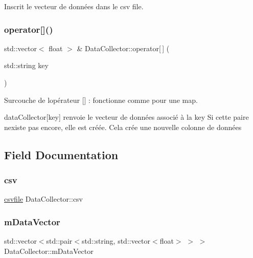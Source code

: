 Inscrit le vecteur de données dans le csv file. 

\mbox{\label{classDataCollector_aa7cc44e889e13c2b03d0128917c57454}} 
\subsubsection{\texorpdfstring{operator[]()}{operator[]()}}
{\footnotesize\ttfamily std\+::vector$<$ float $>$ \& Data\+Collector\+::operator\mbox{[}$\,$\mbox{]} (\begin{DoxyParamCaption}\item[{std\+::string}]{key }\end{DoxyParamCaption})}



Surcouche de l\textquotesingle{}opérateur \mbox{[}\mbox{]} \+: fonctionne comme pour une map. 

data\+Collector\mbox{[}key\mbox{]} renvoie le vecteur de données associé à la key Si cette paire n\textquotesingle{}existe pas encore, elle est créée. Cela crée une nouvelle colonne de données 

\subsection{Field Documentation}
\mbox{\label{classDataCollector_a8150de03c388af2d36cfb8f15cd28189}} 
\subsubsection{\texorpdfstring{csv}{csv}}
{\footnotesize\ttfamily \hyperlink{classcsvfile}{csvfile} Data\+Collector\+::csv\hspace{0.3cm}{\ttfamily [private]}}

\mbox{\label{classDataCollector_a97505c7a9d744d9e3bbeb9909d76bb9f}} 
\subsubsection{\texorpdfstring{m\+Data\+Vector}{mDataVector}}
{\footnotesize\ttfamily std\+::vector$<$std\+::pair$<$std\+::string, std\+::vector$<$float$>$ $>$ $>$ Data\+Collector\+::m\+Data\+Vector\hspace{0.3cm}{\ttfamily [private]}}



